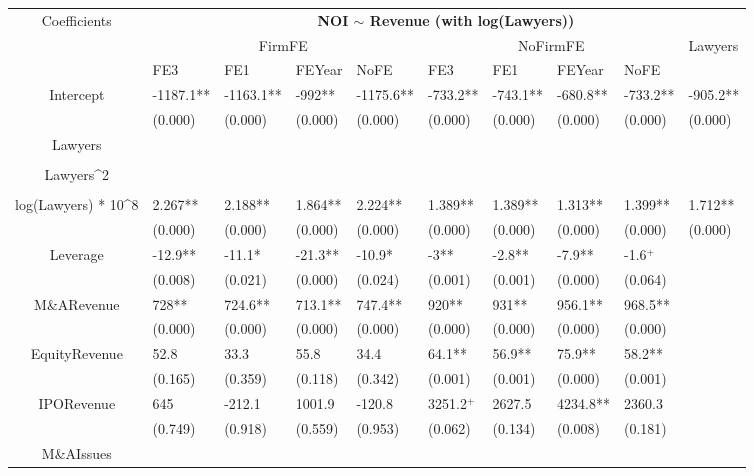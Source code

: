 \documentclass{article}
\begin{document}
\begin{table}[H]
\centering
\begin{tabular}{|clllllllll|}
\hline
\multirow{3}{*}{Coefficients} & \multicolumn{9}{c|}{\textbf{NOI $\sim$ Revenue (with log(Lawyers))}} \\
\cline{2-10}
& \multicolumn{4}{c}{FirmFE} & \multicolumn{4}{c}{NoFirmFE} & \multirow{2}{*}{Lawyers} \\
\cline{2-9}
& FE3 & FE1 & FEYear & NoFE & FE3 & FE1 & FEYear & NoFE &  \\
\hline
 
Intercept & -1187.1** & -1163.1** & -992** & -1175.6** & -733.2** & -743.1** & -680.8** & -733.2** & -905.2** \\ 
   & (0.000) & (0.000) & (0.000) & (0.000) & (0.000) & (0.000) & (0.000) & (0.000) & (0.000) \\ 
  Lawyers &  &  &  &  &  &  &  &  &  \\ 
   &  &  &  &  &  &  &  &  &  \\ 
  Lawyers^2 &  &  &  &  &  &  &  &  &  \\ 
   &  &  &  &  &  &  &  &  &  \\ 
  log(Lawyers) * 10^8 & 2.267** & 2.188** & 1.864** & 2.224** & 1.389** & 1.389** & 1.313** & 1.399** & 1.712** \\ 
   & (0.000) & (0.000) & (0.000) & (0.000) & (0.000) & (0.000) & (0.000) & (0.000) & (0.000) \\ 
  Leverage & -12.9** & -11.1* & -21.3** & -10.9* & -3** & -2.8** & -7.9** & -1.6$^{+}$ &  \\ 
   & (0.008) & (0.021) & (0.000) & (0.024) & (0.001) & (0.001) & (0.000) & (0.064) &  \\ 
  M\&ARevenue & 728** & 724.6** & 713.1** & 747.4** & 920** & 931** & 956.1** & 968.5** &  \\ 
   & (0.000) & (0.000) & (0.000) & (0.000) & (0.000) & (0.000) & (0.000) & (0.000) &  \\ 
  EquityRevenue & 52.8 & 33.3 & 55.8 & 34.4 & 64.1** & 56.9** & 75.9** & 58.2** &  \\ 
   & (0.165) & (0.359) & (0.118) & (0.342) & (0.001) & (0.001) & (0.000) & (0.001) &  \\ 
  IPORevenue & 645 & -212.1 & 1001.9 & -120.8 & 3251.2$^{+}$ & 2627.5 & 4234.8** & 2360.3 &  \\ 
   & (0.749) & (0.918) & (0.559) & (0.953) & (0.062) & (0.134) & (0.008) & (0.181) &  \\ 
  M\&AIssues &  &  &  &  &  &  &  &  &  \\ 

\end{tabular}
\end{table}
\end{document}
